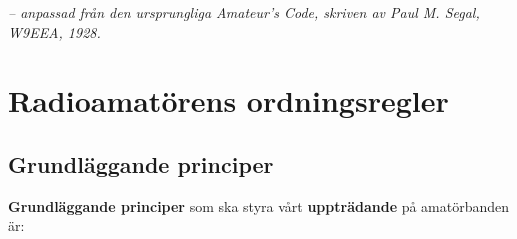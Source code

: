   
  
  
  

\emph{-- anpassad från den ursprungliga Amateur's Code, skriven av Paul M. Segal, W9EEA, 1928.}

\section[Ordningsregler]{Radioamatörens ordnings\-regler}

\subsection{Grundläggande principer}
\textbf{Grundläggande principer} som ska styra vårt \textbf{uppträdande} på
amatörbanden är:

